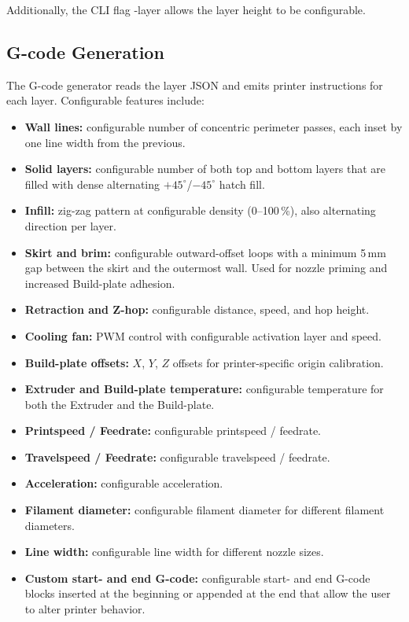 \documentclass[10pt,twocolumn,a4paper]{article}
\begin{document}
Additionally, the CLI flag -layer allows the layer height to be configurable.

\subsection{G-code Generation}

The G-code generator reads the layer JSON and emits printer
instructions for each layer. Configurable features include:

\begin{itemize}
  \item \textbf{Wall lines:} configurable number of concentric
        perimeter passes, each inset by one line width from the previous.
  \item \textbf{Solid layers:} configurable number of both top and bottom layers that are filled with dense alternating $+45^{\circ}$/$-45^{\circ}$ hatch fill.
  \item \textbf{Infill:} zig-zag pattern at configurable density
        (0--100\,\%), also alternating direction per layer.
  \item \textbf{Skirt and brim:} configurable outward-offset loops with a
        minimum 5\,mm gap between the skirt and the outermost wall. Used for nozzle priming and increased Build-plate adhesion.
  \item \textbf{Retraction and Z-hop:} configurable distance,
        speed, and hop height.
  \item \textbf{Cooling fan:} PWM control with configurable
        activation layer and speed.
  \item \textbf{Build-plate offsets:} $X$, $Y$, $Z$ offsets
        for printer-specific origin calibration.
  \item \textbf{Extruder and Build-plate temperature:} configurable temperature for both the Extruder and the Build-plate.     
  \item \textbf{Printspeed / Feedrate:} configurable printspeed / feedrate.
  \item \textbf{Travelspeed / Feedrate:} configurable travelspeed / feedrate.
  \item \textbf{Acceleration:} configurable acceleration.
  \item \textbf{Filament diameter:} configurable filament diameter for different filament diameters.
  \item \textbf{Line width:} configurable line width for different nozzle sizes.
  \item \textbf{Custom start- and end G-code:} configurable start- and end G-code blocks inserted at the beginning or appended at the end that allow the user to alter printer behavior.
\end{itemize}
\end{document}
